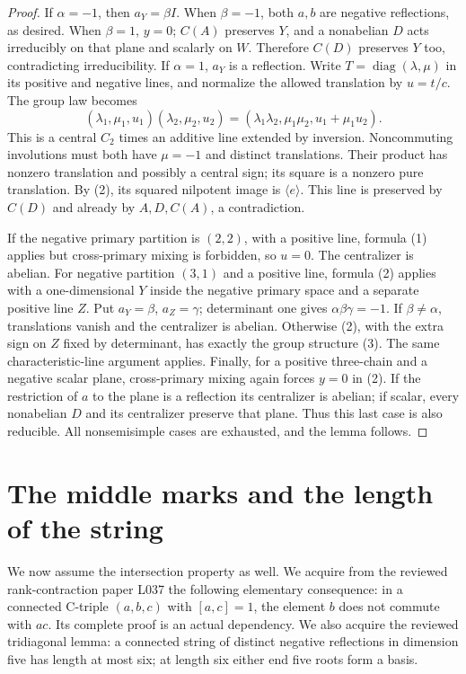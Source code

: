 \documentclass[11pt,a4paper]{article}
\newcommand{\gen}[1]{\langle#1\rangle}\newcommand{\Om}{\Omega}
\begin{document}
\begin{proof}
If $\alpha=-1$, then $a_Y=\beta I$. When $\beta=-1$, both
$a,b$ are negative reflections, as desired. When $\beta=1$, $y=0$;
$C(A)$ preserves $Y$, and a nonabelian $D$ acts irreducibly on that
plane and scalarly on $W$. Therefore $C(D)$ preserves $Y$ too,
contradicting irreducibility. If $\alpha=1$, $a_Y$ is a reflection.
Write $T=\operatorname{diag}(\lambda,\mu)$ in its positive and
negative lines, and normalize the allowed translation by $u=t/c$.
The group law becomes
\[
 (\lambda_1,\mu_1,u_1)(\lambda_2,\mu_2,u_2)
 =(\lambda_1\lambda_2,\mu_1\mu_2,u_1+\mu_1u_2).
                                                               \tag{3}
\]
This is a central $C_2$ times an additive line extended by inversion.
Noncommuting involutions must both have $\mu=-1$ and distinct
translations. Their product has nonzero translation and possibly a
central sign; its square is a nonzero pure translation. By (2), its
squared nilpotent image is $\gen e$. This line is preserved by
$C(D)$ and already by $A,D,C(A)$, a contradiction.

If the negative primary partition is $(2,2)$, with a positive line,
formula (1) applies but cross-primary mixing is forbidden, so $u=0$.
The centralizer is abelian. For negative partition $(3,1)$ and a
positive line, formula (2) applies with a one-dimensional $Y$ inside
the negative primary space and a separate positive line $Z$. Put
$a_Y=\beta$, $a_Z=\gamma$; determinant one gives
$\alpha\beta\gamma=-1$. If $\beta\ne\alpha$, translations vanish
and the centralizer is abelian. Otherwise (2), with the extra sign
on $Z$ fixed by determinant, has exactly the group structure (3).
The same characteristic-line argument applies. Finally, for a positive
three-chain and a negative scalar plane, cross-primary mixing again
forces $y=0$ in (2). If the restriction of $a$ to the plane is a
reflection its centralizer is abelian; if scalar, every nonabelian
$D$ and its centralizer preserve that plane. Thus this last case is
also reducible. All nonsemisimple cases are exhausted, and the lemma
follows.
\end{proof}

\section{The middle marks and the length of the string}
We now assume the intersection property as well. We acquire from the
reviewed rank-contraction paper L037 the following elementary consequence:
in a connected C-triple $(a,b,c)$ with $[a,c]=1$, the element $b$
does not commute with $ac$. Its complete proof is an actual dependency.
We also acquire the reviewed tridiagonal lemma: a connected string of
distinct negative reflections in dimension five has length at most six;
at length six either end five roots form a basis.
\end{document}
